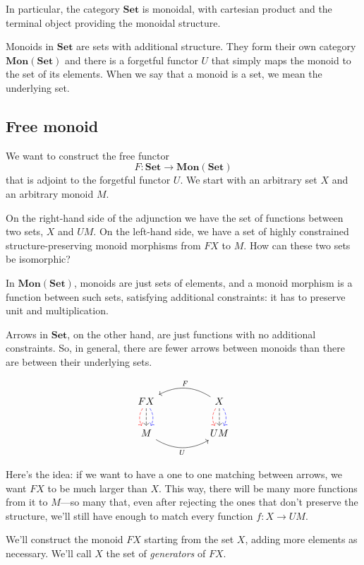 \documentclass[DaoFP]{subfiles}
\begin{document}
In particular, the category $\mathbf{Set}$ is monoidal, with cartesian product and the terminal object providing the monoidal structure. 

Monoids in $\mathbf{Set}$ are sets with additional structure. They form their own category $\mathbf{Mon}(\mathbf{Set})$ and there is a forgetful functor $U$ that simply maps the monoid to the set of its elements. When we say that a monoid is a set, we mean the underlying set.

\subsection{Free monoid}

We want to construct the free functor 
\[ F \colon \mathbf{Set} \to \mathbf{Mon}(\mathbf{Set})\]
that is adjoint to the forgetful functor $U$. We start with an arbitrary set $X$ and an arbitrary monoid $M$. 

On the right-hand side of the adjunction we have the set of functions between two sets, $X$ and $U M$. On the left-hand side, we have a set of highly constrained structure-preserving monoid morphisms from $F X$ to $M$. How can these two sets be isomorphic?

In  $\mathbf{Mon}(\mathbf{Set})$, monoids are just sets of elements, and a monoid morphism is a function between such sets, satisfying additional constraints: it has to preserve unit and multiplication. 

Arrows in $\mathbf{Set}$, on the other hand, are just functions with no additional constraints. So, in general, there are fewer arrows between monoids than there are between their underlying sets. 

\[
 \begin{tikzcd}
F X
\arrow[d, bend right, red, dashed]
\arrow[d, dashed]
\arrow[d, bend left, blue, dashed]
  &&
  X
\arrow[d, bend right, red, dashed]
\arrow[d, dashed]
\arrow[d, bend left, blue, dashed]
 \arrow[ll, bend right, "F"']
 \\
M
   \arrow[rr, bend right, "U"']
 &&
 U M
  \end{tikzcd}
\]

Here's the idea: if we want to have a one to one matching between arrows, we want $F X$ to be much larger than $X$. This way, there will be many more functions from it to $M$---so many that, even after rejecting the ones that don't preserve the structure, we'll still have enough to match every function $f \colon X \to U M$.

We'll construct the monoid $F X$ starting from the set $X$, adding more elements as necessary. We'll call $X$ the set of \emph{generators} of $F X$.
\end{document}

